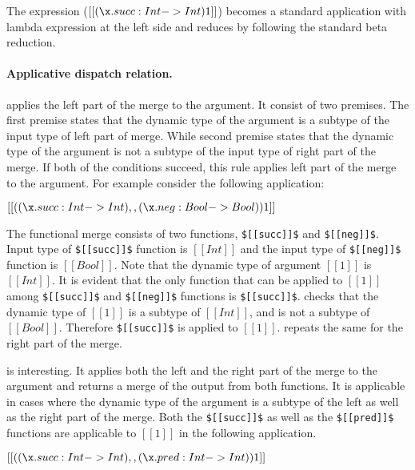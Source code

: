 \noindent The expression ($[[(\x.succ:Int->Int) 1]]$) becomes a 
standard application with lambda expression at the left side
and reduces by following the standard beta reduction.

\paragraph{Applicative dispatch relation.}
 applies the left part of the merge to the argument.
It consist of two premises. The first premise states that
the dynamic type of the argument is a subtype of
the input type of left part of merge. While second premise 
states that the dynamic type of the argument is not a subtype of 
the input type of right part of the merge.
If both of the conditions succeed, this rule
applies left part of the merge to the argument.
For example consider the following application:

\begin{center}
$[[((\x.succ:Int->Int) ,, (\x.neg:Bool->Bool)) 1]]$
\end{center}

The functional merge consists of two functions,
\lstinline{$[[succ]]$} and \lstinline{$[[neg]]$}. Input type of
\lstinline{$[[succ]]$} function is $[[Int]]$ and the input type
of \lstinline{$[[neg]]$} function is $[[Bool]]$.
Note that the dynamic type of argument $[[1]]$ is $[[Int]]$.
It is evident that the only function that can be applied to $[[1]]$
among \lstinline{$[[succ]]$} and \lstinline{$[[neg]]$} functions is
\lstinline{$[[succ]]$}.  checks that the dynamic
type of $[[1]]$ is a subtype of $[[Int]]$, and is not a subtype
of $[[Bool]]$. Therefore \lstinline{$[[succ]]$} is applied to $[[1]]$.
 repeats the same for the right part of the merge.

 is interesting. It applies both the left and the right
part of the merge to the argument and returns a merge of the
output from both functions. It is applicable in cases where the
dynamic type of the argument is a subtype of the left as well as the right
part of the merge. Both the \lstinline{$[[succ]]$} as well as 
the \lstinline{$[[pred]]$} functions are applicable to $[[1]]$
in the following application.

\begin{center}
$[[((\x.succ:Int->Int) ,, (\x.pred:Int->Int)) 1]]$
\end{center}


